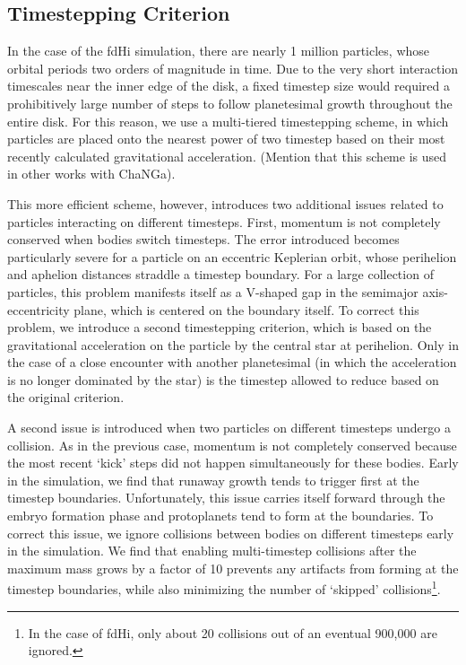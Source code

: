\documentclass[twocolumn]{aastex63}
\begin{document}
\subsection{Timestepping Criterion}

In the case of the fdHi simulation, there are nearly 1 million particles, whose orbital periods two orders of magnitude in time. Due to the very short interaction timescales near the inner edge of the disk, a fixed timestep size would required a prohibitively large number of steps to follow planetesimal growth throughout the entire disk. For this reason, we use a multi-tiered timestepping scheme, in which particles are placed onto the nearest power of two timestep based on their most recently calculated gravitational acceleration. (Mention that this scheme is used in other works with ChaNGa).

This more efficient scheme, however, introduces two additional issues related to particles interacting on different timesteps. First, momentum is not completely conserved when bodies switch timesteps. The error introduced becomes particularly severe for a particle on an eccentric Keplerian orbit, whose perihelion and aphelion distances straddle a timestep boundary. For a large collection of particles, this problem manifests itself as a V-shaped gap in the semimajor axis-eccentricity plane, which is centered on the boundary itself. To correct this problem, we introduce a second timestepping criterion, which is based on the gravitational acceleration on the particle by the central star at perihelion. Only in the case of a close encounter with another planetesimal (in which the acceleration is no longer dominated by the star) is the timestep allowed to reduce based on the original criterion.

A second issue is introduced when two particles on different timesteps undergo a collision. As in the previous case, momentum is not completely conserved because the most recent `kick' steps did not happen simultaneously for these bodies. Early in the simulation, we find that runaway growth tends to trigger first at the timestep boundaries. Unfortunately, this issue carries itself forward through the embryo formation phase and protoplanets tend to form at the boundaries. To correct this issue, we ignore collisions between bodies on different timesteps early in the simulation. We find that enabling multi-timestep collisions after the maximum mass grows by a factor of 10 prevents any artifacts from forming at the timestep boundaries, while also minimizing the number of `skipped' collisions\footnote{In the case of fdHi, only about 20 collisions out of an eventual 900,000 are ignored.}. 
\end{document}

